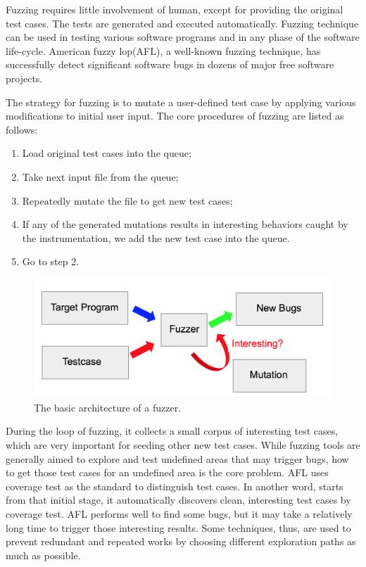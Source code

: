\documentclass[sigplan,10pt,review = false]{acmart}\settopmatter{printfolios=true,printccs=false,printacmref=false}
\begin{document}
Fuzzing requires little involvement of human, except for providing the original test cases. The tests are generated and executed automatically. Fuzzing technique can be used in testing various software programs and in any phase of the software life-cycle. American fuzzy lop(AFL)\cite{gutmannfuzzing}, a well-known fuzzing technique, has successfully detect significant software bugs in dozens of major free software projects.

The strategy for fuzzing is to mutate a user-defined test case by applying various modifications to initial user input. The core procedures of fuzzing are listed as follows:
\begin{enumerate}
\item Load original test cases into the queue; 
\item Take next input file from the queue;
\item Repeatedly mutate the file to get new test cases;
\item If any of the generated mutations results in interesting behaviors caught by the instrumentation, we add the new test case into the queue.
\item Go to step 2.
\end{enumerate}

\begin{figure}[h]
\centering
\includegraphics[scale=.4]{fuzzer_achitecture}
\caption{The basic architecture of a fuzzer.}
\end{figure}

During the loop of fuzzing, it collects a small corpus of interesting test cases, which are very important for seeding other new test cases. While fuzzing tools are generally aimed to explore and test undefined areas that may trigger bugs, how to get those test cases for an undefined area is the core problem. AFL uses coverage test as the standard to distinguish test cases. In another word, starts from that initial stage, it automatically discovers clean, interesting test cases by coverage test. AFL performs well to find some bugs, but it may take a relatively long time to trigger those interesting results. Some techniques, thus, are used to prevent redundant and repeated works by choosing different exploration paths as much as possible.
\end{document}
